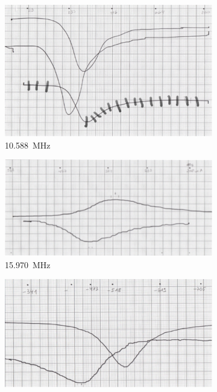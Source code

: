 \begin{figure}
	\centering
	\begin{subfigure}{0.5\textwidth}
		\includegraphics[width=\linewidth]{Scan10.pdf}
		\caption{\SI{10.588}{\mega\hertz}}
		\label{fig:Scan10} 
	\end{subfigure}
	\begin{subfigure}{0.5\textwidth}
		\includegraphics[width=\linewidth]{Scan15.pdf}
		\caption{\SI{15.970}{\mega\hertz}}
		\label{fig:Scan15}
	\end{subfigure}
	\begin{subfigure}{0.5\textwidth}
		\includegraphics[width=1\linewidth]{Scan20.pdf}

\end{subfigure}
\end{figure}
